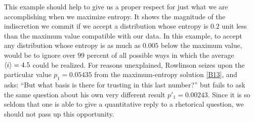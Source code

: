 This example should help to give us a proper respect for just what we are accomplishing when we maximize entropy.
It shows the magnitude of the indiscretion we commit if we accept a distribution whose entropy is $0.2$ unit less than the maximum value compatible with our data.
In this example, to accept any distribution whose entropy is as much as $0.005$ below the maximum value, would be to ignore over $99$ percent of all possible ways in which the average $\langle i\rangle = 4.5$ could be realized.
For reasons unexplained, Rowlinson seizes upon the particular value $p_1 = 0.05435$ from the maximum-entropy solution \eqref{B13}, and asks: ``But what basis is there for trusting in this last number?'' but fails to ask the same question about his own very different result $p'_1 = 0.00243$.
Since it is so seldom that one is able to give a quantitative reply to a rhetorical question, we should not pass up this opportunity.


